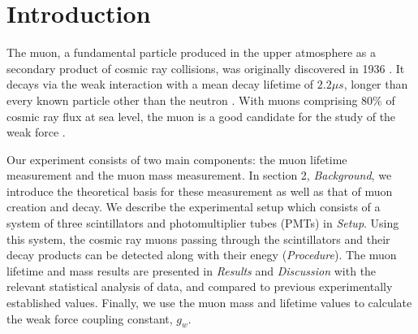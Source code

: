 
\section{Introduction}

The muon, a fundamental particle produced in the upper atmosphere as a
secondary product of cosmic ray collisions, was originally discovered
in 1936 \cite{}. It decays via the weak interaction with a mean decay
lifetime of $2.2 \mu s$, longer than every known particle other than
the neutron \cite{}. With muons comprising $80$\% of cosmic ray flux at
sea level, the muon is a good candidate for the study of the weak
force \cite{}.

Our experiment consists of two main components: the muon lifetime
measurement and the muon mass measurement. In section 2,
\emph{Background}, we introduce the theoretical basis for these
measurement as well as that of muon creation and decay. We describe
the experimental setup which consists of a system of three
scintillators and photomultiplier tubes (PMTs) in \emph{Setup}. Using
this system, the cosmic ray muons passing through the scintillators
and their decay products can be detected along with their enegy
(\emph{Procedure}). The muon lifetime and mass results are presented in
\emph{Results} and \emph{Discussion} with the relevant statistical
analysis of data, and compared to previous experimentally established
values. Finally, we use the muon mass and lifetime values to calculate
the weak force coupling constant, $g_w$.
